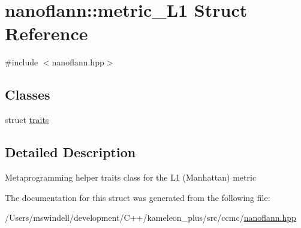 \hypertarget{structnanoflann_1_1metric___l1}{\section{nanoflann\-:\-:metric\-\_\-\-L1 Struct Reference}
\label{structnanoflann_1_1metric___l1}
}


{\ttfamily \#include $<$nanoflann.\-hpp$>$}

\subsection*{Classes}
\begin{DoxyCompactItemize}
\item 
struct \hyperlink{structnanoflann_1_1metric___l1_1_1traits}{traits}
\end{DoxyCompactItemize}


\subsection{Detailed Description}
Metaprogramming helper traits class for the L1 (Manhattan) metric 

The documentation for this struct was generated from the following file\-:\begin{DoxyCompactItemize}
\item 
/\-Users/mswindell/development/\-C++/kameleon\-\_\-plus/src/ccmc/\hyperlink{nanoflann_8hpp}{nanoflann.\-hpp}\end{DoxyCompactItemize}
